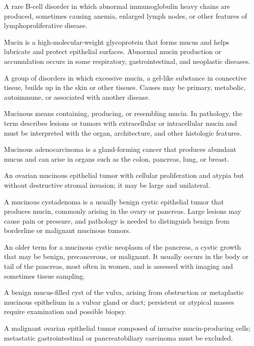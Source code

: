  A rare B-cell disorder in which abnormal immunoglobulin heavy chains are produced, sometimes causing anemia, enlarged lymph nodes, or other features of lymphoproliferative disease.

 Mucin is a high-molecular-weight glycoprotein that forms mucus and helps lubricate and protect epithelial surfaces. Abnormal mucin production or accumulation occurs in some respiratory, gastrointestinal, and neoplastic diseases.

 A group of disorders in which excessive mucin, a gel-like substance in connective tissue, builds up in the skin or other tissues. Causes may be primary, metabolic, autoimmune, or associated with another disease.

 Mucinous means containing, producing, or resembling mucin. In pathology, the term describes lesions or tumors with extracellular or intracellular mucin and must be interpreted with the organ, architecture, and other histologic features.

 Mucinous adenocarcinoma is a gland-forming cancer that produces abundant mucus and can arise in organs such as the colon, pancreas, lung, or breast.

 An ovarian mucinous epithelial tumor with cellular proliferation and atypia but without destructive stromal invasion; it may be large and unilateral.

 A mucinous cystadenoma is a usually benign cystic epithelial tumor that produces mucin, commonly arising in the ovary or pancreas. Large lesions may cause pain or pressure, and pathology is needed to distinguish benign from borderline or malignant mucinous tumors.

 An older term for a mucinous cystic neoplasm of the pancreas, a cystic growth that may be benign, precancerous, or malignant. It usually occurs in the body or tail of the pancreas, most often in women, and is assessed with imaging and sometimes tissue sampling.

 A benign mucus-filled cyst of the vulva, arising from obstruction or metaplastic mucinous epithelium in a vulvar gland or duct; persistent or atypical masses require examination and possible biopsy.

 A malignant ovarian epithelial tumor composed of invasive mucin-producing cells; metastatic gastrointestinal or pancreatobiliary carcinoma must be excluded.


